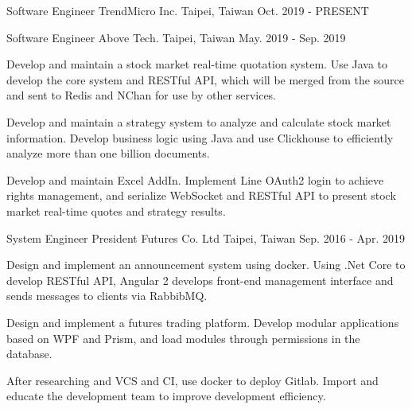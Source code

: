 

\begin{cventries}

\cventry
{Software Engineer} %
{TrendMicro Inc.} %
{Taipei, Taiwan} %
{Oct. 2019 - PRESENT} %
{
  \begin{cvitems} %
    \item {}
  \end{cvitems}
}

\cventry
{Software Engineer} %
{Above Tech.} %
{Taipei, Taiwan} %
{May. 2019 - Sep. 2019} %
{
  \begin{cvitems} %
    \item {Develop and maintain a stock market real-time quotation system. Use Java to develop the core system and RESTful API, which will be merged from the source and sent to Redis and NChan for use by other services.}
    \item {Develop and maintain a strategy system to analyze and calculate stock market information. Develop business logic using Java and use Clickhouse to efficiently analyze more than one billion documents.}
    \item {Develop and maintain Excel AddIn. Implement Line OAuth2 login to achieve rights management, and serialize WebSocket and RESTful API to present stock market real-time quotes and strategy results.}
  \end{cvitems}
}

\cventry
{System Engineer} %
{President Futures Co. Ltd} %
{Taipei, Taiwan} %
{Sep. 2016 - Apr. 2019} %
{
  \begin{cvitems} %
    \item {Design and implement an announcement system using docker. Using .Net Core to develop RESTful API, Angular 2 develops front-end management interface and sends messages to clients via RabbibMQ.}
    \item {Design and implement a futures trading platform. Develop modular applications based on WPF and Prism, and load modules through permissions in the database.}
    \item {After researching and VCS and CI, use docker to deploy Gitlab. Import and educate the development team to improve development efficiency.}
  \end{cvitems}
}

\end{cventries}
